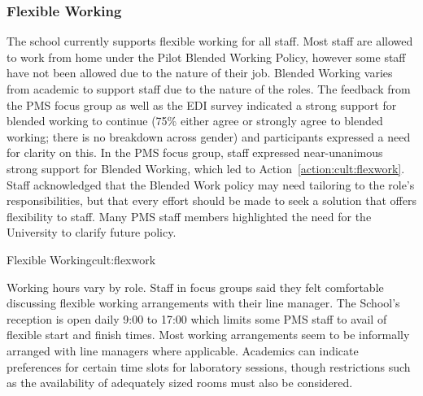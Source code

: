 \subsubsection{Flexible Working}

The school currently supports flexible working for all staff. 
Most staff are allowed to work from home under the Pilot Blended Working Policy, however some staff have not been allowed due to the nature of their job.
Blended Working varies from academic to support staff due to the nature of the roles. The feedback from the PMS focus group as well as the EDI survey indicated a strong support for blended working to continue (75\% either agree or strongly agree to blended working; there is no breakdown across gender) and participants expressed a need for clarity on this.
In the PMS focus group, staff expressed near-unanimous strong support for Blended Working, which led to Action~\ref{action:cult:flexwork}. Staff acknowledged that the Blended Work policy may need tailoring to the role’s responsibilities, but that every effort should be made to seek a solution that offers flexibility to staff. Many PMS staff members highlighted the need for the University to clarify future policy. 


\begin{actionblock}{\ksspace{}Flexible Working}{cult:flexwork}
\actadoptflex
\hfill{
    \hypersetup{hidelinks}
    \hyperlink{e5}{\gotoactionsymbol{}}
}
\end{actionblock}
 

Working hours vary by role. Staff in focus groups said they felt comfortable discussing flexible working arrangements with their line manager. The School's reception is open daily 9:00 to 17:00 which limits some PMS staff to avail of flexible start and finish times. Most working arrangements seem to be informally arranged with line managers where applicable.  
Academics can indicate preferences for certain time slots for laboratory sessions, though  restrictions such as the availability of adequately sized rooms must also be considered. 

